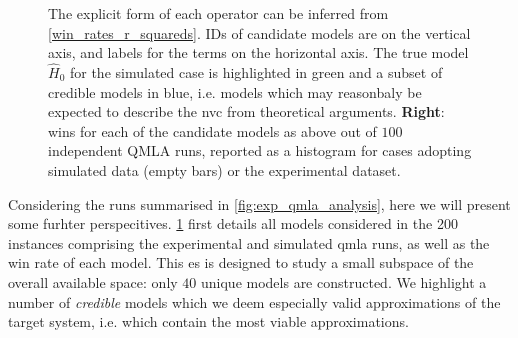 \begin{figure}
{    The explicit form of each operator can be inferred from \cref{win_rates_r_squareds}.
    IDs of candidate models are on the vertical axis, and labels for the terms on the horizontal axis.
    The \gls{true model} $\hat{H}_0$ for the simulated case is highlighted in green and a subset of credible models in blue, 
    i.e. models which may reasonbaly be expected to describe the \gls{nvc} from theoretical arguments.
    \textbf{Right}: wins for each of the candidate models as above out of $100$ independent QMLA runs, 
    reported as a histogram for cases adopting simulated data (empty bars) or the experimental dataset.
    \figtableref
    } 
    \label{fig:nv_model_composition}
\end{figure}

Considering the \glspl{run} summarised in \cref{fig:exp_qmla_analysis}, here we will present some furhter perspecitives.
\cref{fig:nv_model_composition} first details all models considered in the 200 \glspl{instance} 
    comprising the experimental and simulated \gls{qmla} \glspl{run}, 
    as well as the  \gls{win rate}  of each model. 
This \gls{es} is designed to study a small subspace of the overall available space:
    only $40$ unique models are constructed. 
We highlight a number of \emph{credible} models which we deem especially valid approximations of the target system, 
    i.e. which contain the most viable approximations. 
\par 

